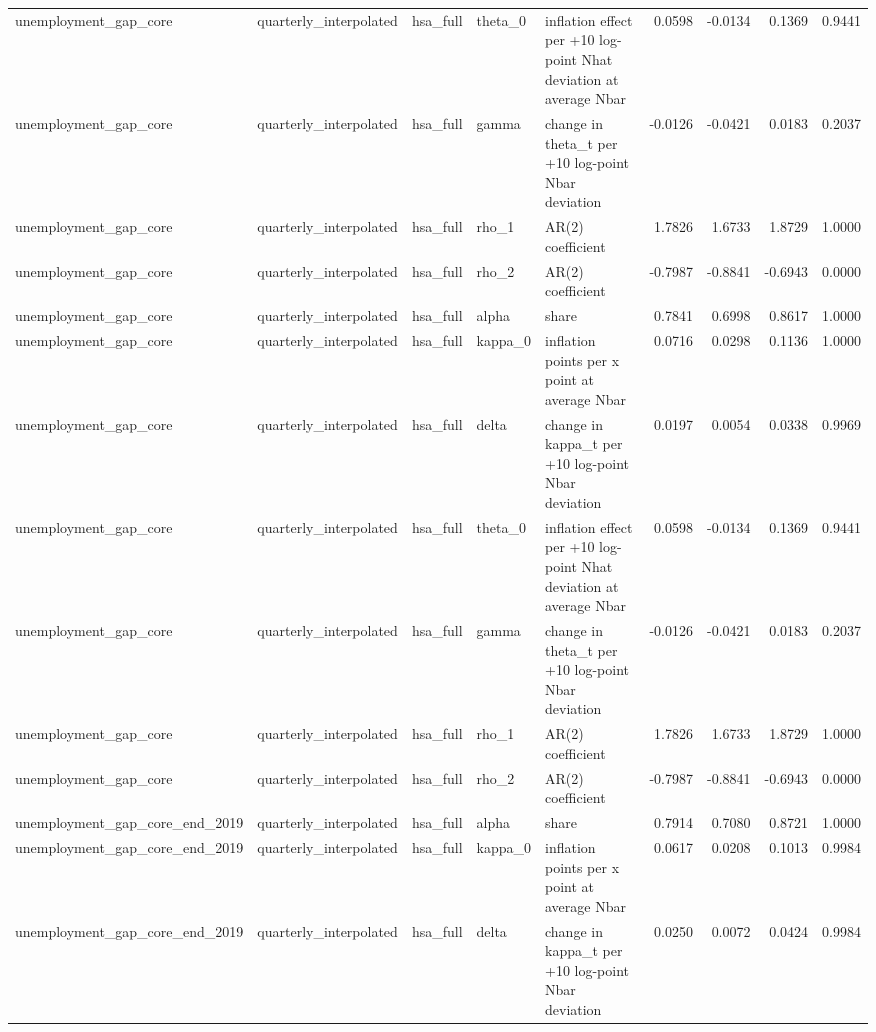 \begin{tabular}{lllllrrrr}
unemployment\_gap\_core & quarterly\_interpolated & hsa\_full & theta\_0 & inflation effect per +10 log-point Nhat deviation at average Nbar & 0.0598 & -0.0134 & 0.1369 & 0.9441 \\
unemployment\_gap\_core & quarterly\_interpolated & hsa\_full & gamma & change in theta\_t per +10 log-point Nbar deviation & -0.0126 & -0.0421 & 0.0183 & 0.2037 \\
unemployment\_gap\_core & quarterly\_interpolated & hsa\_full & rho\_1 & AR(2) coefficient & 1.7826 & 1.6733 & 1.8729 & 1.0000 \\
unemployment\_gap\_core & quarterly\_interpolated & hsa\_full & rho\_2 & AR(2) coefficient & -0.7987 & -0.8841 & -0.6943 & 0.0000 \\
unemployment\_gap\_core & quarterly\_interpolated & hsa\_full & alpha & share & 0.7841 & 0.6998 & 0.8617 & 1.0000 \\
unemployment\_gap\_core & quarterly\_interpolated & hsa\_full & kappa\_0 & inflation points per x point at average Nbar & 0.0716 & 0.0298 & 0.1136 & 1.0000 \\
unemployment\_gap\_core & quarterly\_interpolated & hsa\_full & delta & change in kappa\_t per +10 log-point Nbar deviation & 0.0197 & 0.0054 & 0.0338 & 0.9969 \\
unemployment\_gap\_core & quarterly\_interpolated & hsa\_full & theta\_0 & inflation effect per +10 log-point Nhat deviation at average Nbar & 0.0598 & -0.0134 & 0.1369 & 0.9441 \\
unemployment\_gap\_core & quarterly\_interpolated & hsa\_full & gamma & change in theta\_t per +10 log-point Nbar deviation & -0.0126 & -0.0421 & 0.0183 & 0.2037 \\
unemployment\_gap\_core & quarterly\_interpolated & hsa\_full & rho\_1 & AR(2) coefficient & 1.7826 & 1.6733 & 1.8729 & 1.0000 \\
unemployment\_gap\_core & quarterly\_interpolated & hsa\_full & rho\_2 & AR(2) coefficient & -0.7987 & -0.8841 & -0.6943 & 0.0000 \\
unemployment\_gap\_core\_end\_2019 & quarterly\_interpolated & hsa\_full & alpha & share & 0.7914 & 0.7080 & 0.8721 & 1.0000 \\
unemployment\_gap\_core\_end\_2019 & quarterly\_interpolated & hsa\_full & kappa\_0 & inflation points per x point at average Nbar & 0.0617 & 0.0208 & 0.1013 & 0.9984 \\
unemployment\_gap\_core\_end\_2019 & quarterly\_interpolated & hsa\_full & delta & change in kappa\_t per +10 log-point Nbar deviation & 0.0250 & 0.0072 & 0.0424 & 0.9984 \\

\end{tabular}
